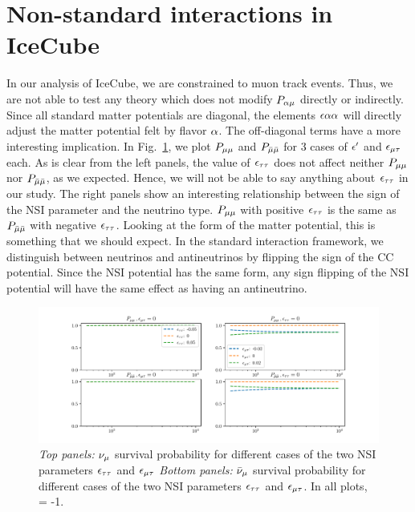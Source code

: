\documentclass[draft=True]{thesis}
\begin{document}
\section{Non-standard interactions in IceCube}
In our analysis of IceCube, we are constrained to muon track events. Thus, we are not able to test any theory which does not modify $P_{\alpha \mu}$ directly or 
indirectly. Since all standard matter potentials are diagonal, the elements $\epsilon{\ensuremath{\alpha}\ensuremath{\alpha}}$ will directly adjust the matter potential felt 
by flavor $\alpha$. The off-diagonal terms have a more interesting implication. %
In Fig.~\ref{fig:IC_NSI_probs}, we plot $P_{\mu\mu}$ and $P_{\bar{\mu} \bar{\mu}}$ for 3 cases of $\epsilon^\prime$ and $\epsilon_{\mu\tau}$ each. As is clear from the 
left panels, the value of $\epsilon_{\tau\tau}$ does not affect neither $P_{\mu\mu}$ nor $P_{\bar{\mu} \bar{\mu}}$, as we expected. Hence, we will not be able
to say anything about $\epsilon_{\tau\tau}$ in our study. The right panels show an interesting relationship between the sign of the NSI parameter 
and the neutrino type. $P_{\mu\mu}$ with positive $\epsilon_{\tau\tau}$ is the same as $P_{\bar{\mu} \bar{\mu}}$ with negative $\epsilon_{\tau\tau}$. Looking at the form of the matter potential, 
this is something that we should expect. In the standard interaction framework, we distinguish between neutrinos and antineutrinos by flipping the sign 
of the CC potential. Since the NSI potential has the same form, any sign flipping of the NSI potential will have the same effect as 
having an antineutrino.

\begin{figure}\label{fig:IC_NSI_probs}
    \begin{center}
    \includegraphics[width=1\textwidth, height=0.3\textheight]{figures/IC_NSI_probs.pdf}
    \caption{\emph{Top panels: }$\nu_\mu$ survival probability for different cases of the two NSI parameters $\epsilon_{\tau\tau}$ and $\epsilon_{\mu\tau}$
    \emph{Bottom panels: }$\bar\nu_\mu$ survival probability for different cases of the two NSI parameters $\epsilon_{\tau\tau}$ and $\epsilon_{\mu\tau}$.
    In all plots, \ztrue = -1.}
    \end{center}
\end{figure}
\end{document}
